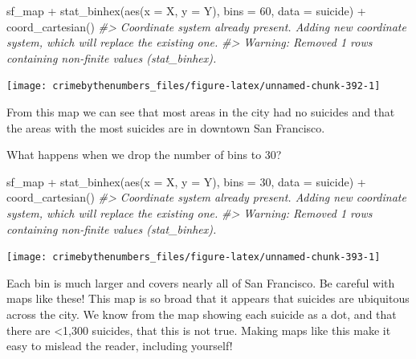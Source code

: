 \documentclass[
]{krantz}
\makeatletter
\newenvironment{Shaded}{\begin{snugshade}}{\end{snugshade}}
\newcommand{\AttributeTok}[1]{\textcolor[rgb]{0.61,0.61,0.61}{#1}}
\newcommand{\CommentTok}[1]{\textcolor[rgb]{0.37,0.37,0.37}{\textit{#1}}}
\newcommand{\DecValTok}[1]{\textcolor[rgb]{0.06,0.06,0.06}{#1}}
\newcommand{\FunctionTok}[1]{\textcolor[rgb]{0,0,0}{#1}}
\newcommand{\NormalTok}[1]{#1}
\newcommand{\SpecialCharTok}[1]{\textcolor[rgb]{0,0,0}{#1}}
\newenvironment{kframe}{%
\medskip{}
\setlength{\fboxsep}{.8em}
 \def\at@end@of@kframe{}%
 \ifinner\ifhmode%
  \def\at@end@of@kframe{\end{minipage}}%
  \begin{minipage}{\columnwidth}%
 \fi\fi%
 \def\FrameCommand##1{\hskip\@totalleftmargin \hskip-\fboxsep
 \colorbox{shadecolor}{##1}\hskip-\fboxsep
     \hskip-\linewidth \hskip-\@totalleftmargin \hskip\columnwidth}%
 \MakeFramed {\advance\hsize-\width
   \@totalleftmargin\z@ \linewidth\hsize
   \@setminipage}}%
 {\par\unskip\endMakeFramed%
 \at@end@of@kframe}
\renewenvironment{Shaded}{\begin{kframe}}{\end{kframe}}
\makeatother
\begin{document}
\begin{Shaded}
\begin{Highlighting}[]
\NormalTok{sf\_map }\SpecialCharTok{+}
  \FunctionTok{stat\_binhex}\NormalTok{(}\FunctionTok{aes}\NormalTok{(}\AttributeTok{x =}\NormalTok{ X, }\AttributeTok{y =}\NormalTok{ Y),}
              \AttributeTok{bins =} \DecValTok{60}\NormalTok{,}
              \AttributeTok{data =}\NormalTok{ suicide) }\SpecialCharTok{+}
  \FunctionTok{coord\_cartesian}\NormalTok{() }
\CommentTok{\#\textgreater{} Coordinate system already present. Adding new coordinate system, which will replace the existing one.}
\CommentTok{\#\textgreater{} Warning: Removed 1 rows containing non{-}finite values (stat\_binhex).}
\end{Highlighting}
\end{Shaded}

\begin{center}\texttt{[image: crimebythenumbers\_files/figure-latex/unnamed-chunk-392-1]} \end{center}

From this map we can see that most areas in the city had no suicides and that the areas with the most suicides are in downtown San Francisco.

What happens when we drop the number of bins to 30?

\begin{Shaded}
\begin{Highlighting}[]
\NormalTok{sf\_map }\SpecialCharTok{+}
  \FunctionTok{stat\_binhex}\NormalTok{(}\FunctionTok{aes}\NormalTok{(}\AttributeTok{x =}\NormalTok{ X, }\AttributeTok{y =}\NormalTok{ Y),}
              \AttributeTok{bins =} \DecValTok{30}\NormalTok{,}
              \AttributeTok{data =}\NormalTok{ suicide) }\SpecialCharTok{+}
  \FunctionTok{coord\_cartesian}\NormalTok{() }
\CommentTok{\#\textgreater{} Coordinate system already present. Adding new coordinate system, which will replace the existing one.}
\CommentTok{\#\textgreater{} Warning: Removed 1 rows containing non{-}finite values (stat\_binhex).}
\end{Highlighting}
\end{Shaded}

\begin{center}\texttt{[image: crimebythenumbers\_files/figure-latex/unnamed-chunk-393-1]} \end{center}

Each bin is much larger and covers nearly all of San Francisco. Be careful with maps like these! This map is so broad that it appears that suicides are ubiquitous across the city. We know from the map showing each suicide as a dot, and that there are \textless1,300 suicides, that this is not true. Making maps like this make it easy to mislead the reader, including yourself!
\end{document}
